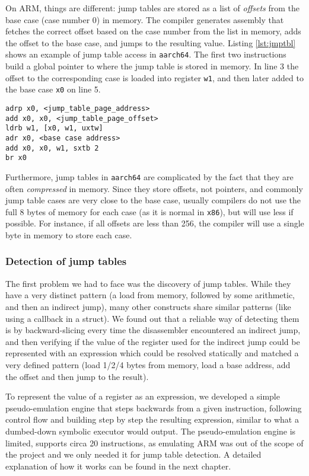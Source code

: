 \documentclass[a4paper,11pt,oneside]{report}
\begin{document}
On ARM, things are different: jump tables are stored as a list of 
\emph{offsets} from the base case (case number 0) in memory. The compiler 
generates assembly that fetches the correct offset based on the case number 
from the list in memory, adds the offset to the base case, and jumps to the 
resulting value. Listing \ref{lst:jmptbl} shows an example of jump table access 
in \texttt{aarch64}. The first two instructions build a global pointer to where 
the jump table is stored in memory. In line 3 the offset to the corresponding 
case is loaded into register \texttt{w1}, and then later added to the base case 
\texttt{x0} on line 5. 


\begin{lstlisting}[label={lst:jmptbl},caption={Example of a jump table in \texttt{aarch64}}]
adrp x0, <jump_table_page_address>
add x0, x0, <jump_table_page_offset>
ldrb w1, [x0, w1, uxtw]
adr x0, <base case address>
add x0, x0, w1, sxtb 2
br x0
\end{lstlisting}

Furthermore, jump tables in \texttt{aarch64} are complicated by the fact that 
they are often \emph{compressed} in memory. Since they store offsets, not 
pointers, and commonly jump table cases are very close to the base case, 
usually compilers do not use the full 8 bytes of memory for each case (as it is 
normal in \texttt{x86}), but will use less if possible. For instance, if all 
offsets are less than 256, the compiler will use a single byte in memory to 
store each case.  

\subsubsection{Detection of jump tables}
The first problem we had to face was the discovery of jump tables. While they 
have a very distinct pattern (a load from memory, followed by some arithmetic, 
and then an indirect jump), many other constructs share similar patterns (like 
using a callback in a struct). We found out that a reliable way of detecting 
them is by backward-slicing every time the disassembler encountered an indirect 
jump, and then verifying if the value of the register used for the indirect 
jump could be represented with an expression which could be resolved statically 
and matched a very defined pattern (load 1/2/4 bytes from memory, load a base 
address, add the offset and then jump to the result). 

To represent the value of a register as an expression, we developed a simple
pseudo-emulation engine that steps backwards from a given instruction, 
following control flow and building step by step the resulting expression, 
similar to what a dumbed-down symbolic executor would output. The 
pseudo-emulation engine is limited, supports circa 20 instructions, as 
emulating ARM was out of the scope of the project and we only needed it for 
jump table detection. A detailed explanation of how it works can be found in 
the next chapter.
\end{document}
